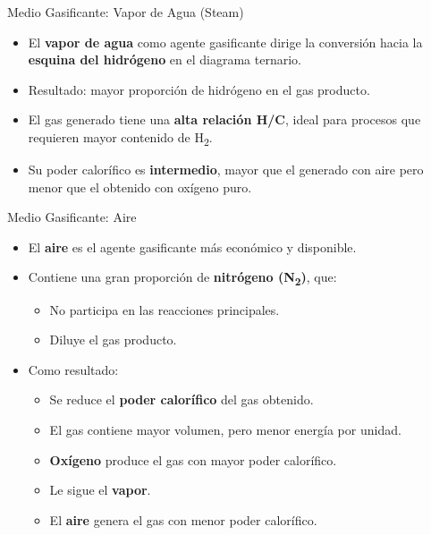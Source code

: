 \documentclass[../../main.tex]{subfiles}
\begin{document}
\begin{frame}{Medio Gasificante: Vapor de Agua (Steam)}

\begin{itemize}
  \item El \textbf{vapor de agua} como agente gasificante dirige la conversión hacia la \textbf{esquina del hidrógeno} en el diagrama ternario.
  \item Resultado: mayor proporción de hidrógeno en el gas producto.
  \item El gas generado tiene una \textbf{alta relación H/C}, ideal para procesos que requieren mayor contenido de H\textsubscript{2}.
  \item Su poder calorífico es \textbf{intermedio}, mayor que el generado con aire pero menor que el obtenido con oxígeno puro.
\end{itemize}
\end{frame}

\begin{frame}{Medio Gasificante: Aire}
\begin{itemize}
  \item El \textbf{aire} es el agente gasificante más económico y disponible.
  \item Contiene una gran proporción de \textbf{nitrógeno (N\textsubscript{2})}, que:
  \begin{itemize}
    \item No participa en las reacciones principales.
    \item Diluye el gas producto.
  \end{itemize}
  \item Como resultado:
  \begin{itemize}
    \item Se reduce el \textbf{poder calorífico} del gas obtenido.
    \item El gas contiene mayor volumen, pero menor energía por unidad.
    \item \textbf{Oxígeno} produce el gas con mayor poder calorífico.
    \item Le sigue el \textbf{vapor}.
    \item El \textbf{aire} genera el gas con menor poder calorífico.
      \end{itemize}
\end{itemize}
\end{frame}
\end{document}
